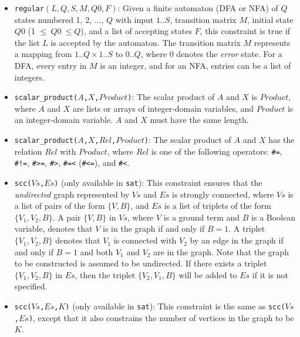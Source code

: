 \begin{itemize}
\item \texttt{regular$(L, Q, S, M, Q0, F)$}:  Given a finite automaton (DFA or NFA) of $Q$ states numbered 1, 2, $\ldots$, $Q$ with input $1..S$, transition matrix $M$, initial state $Q0$ (1 $\le\ Q0\ \le Q$), and a list of accepting states $F$, this constraint is true if the list $L$ is accepted by the automaton. The transition matrix $M$ represents a mapping from $1..Q\times 1..S$ to $0..Q$, where $0$ denotes the {\it error} state.  For a DFA, every entry in $M$ is an integer, and for an NFA, entries can be a list of integers.

\item \texttt{scalar\_product($A$,$X$,$Product$)}: The scalar product of $A$ and $X$ is $Product$, where $A$ and $X$ are lists or arrays of integer-domain variables, and $Product$ is an integer-domain variable. $A$ and $X$ must have the same length.

\item \texttt{scalar\_product($A$,$X$,$Rel$,$Product$)}: The scalar product of $A$ and $X$ has the relation $Rel$ with $Product$, where $Rel$ is one of the following operators: \verb+#=+, \verb+#!=+, \verb+#>=+, \verb+#>+, \verb+#=<+ (\verb+#<=+), and \verb+#<+. 

\item \texttt{scc($Vs$,$Es$)} (only available in \texttt{sat}): This constraint ensures that the \textit{undirected} graph represented by $Vs$ and $Es$ is strongly connected, where $Vs$ is a list of pairs of the form $\{V,B\}$, and $Es$ is a list of triplets of the form $\{V_1,V_2,B\}$. A pair $\{V,B\}$ in $Vs$, where $V$ is a ground term and $B$ is a Boolean variable, denotes that $V$ is in the graph if and only if $B = 1$. A triplet $\{V_1,V_2,B\}$ denotes that $V_1$ is connected with $V_2$  by an edge in the graph if and only if $B = 1$ and both $V_1$ and $V_2$ are in the graph. Note that the graph to be constructed is assumed to be undirected. If there exists a triplet $\{V_1,V_2,B\}$ in $Es$, then the triplet $\{V_2,V_1,B\}$ will be added to $Es$ if it is not specified.

\item \texttt{scc($Vs$,$Es$,$K$)} (only available in \texttt{sat}):  This constraint is the same as \texttt{scc($Vs$,$Es$)}, except that it also constrains the number of vertices in the graph to be $K$. 


\end{itemize}
